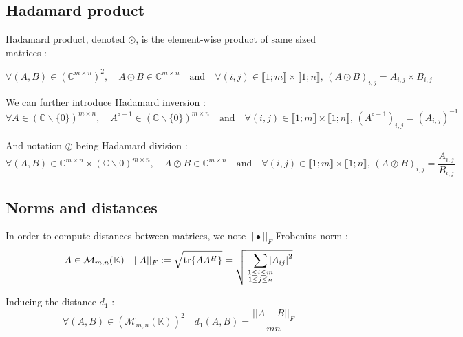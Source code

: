 \documentclass[titlepage]{article}
\newcommand{\hinv}[1]{#1^{\circ-1}} %
\newcommand{\fnorm}[1]{|\vert#1|\vert_{F}} %
\begin{document}
	
		\subsection{Hadamard product}
	
	Hadamard product, denoted $\odot$, is the element-wise product of same sized matrices :
	
	$$
	\forall (A,B)\in\left(\mathbb{C}^{m\times n}\right)^2, \quad A\odot B\in\mathbb{C}^{m\times n} \quad\text{and}\quad \forall (i,j)\in\llbracket1;m\rrbracket\times\llbracket1;n\rrbracket,\, (A\odot B)_{i,j} = A_{i,j}\times B_{i,j}
	$$
	
	We can further introduce Hadamard inversion :
	$$
	\forall A \in \left(\mathbb{C}\backslash\{0\}\right)^{m\times n},\quad \hinv{A}\in\left(\mathbb{C}\backslash\{0\}\right)^{m\times n} \quad\text{and}\quad \forall (i,j)\in\llbracket1;m\rrbracket\times\llbracket1;n\rrbracket,\, \left(\hinv{A}\right)_{i,j} = \left(A_{i,j}\right)^{-1}
	$$ 
	
	And notation $\oslash$ being Hadamard division :
	$$
	\forall (A,B)\in\mathbb{C}^{m\times n}\times\left(\mathbb{C}\backslash0\right)^{m\times n}, \quad A\oslash B\in\mathbb{C}^{m\times n} \quad\text{and}\quad \forall (i,j)\in\llbracket1;m\rrbracket\times\llbracket1;n\rrbracket,\, (A\oslash B)_{i,j} = \frac{A_{i,j}}{B_{i,j}}
	$$
	
	\subsection{Norms and distances}
	
	In order to compute distances between matrices, we note $\fnorm{\bullet}$ Frobenius norm :
	$$
	A\in\mathcal{M}_{m,n}(\mathbb{K}) \quad \fnorm{A} := \sqrt{\tr{AA^H}} = \sqrt{
		\;\;\;\sum_{
			\mathclap{
				\substack{
					1\le i\le m \\1\le j\le n
				}
			}
		}\abs{A_{ij}}^2}
	$$
	
	Inducing the distance $d_1$ :
	$$
	\forall(A,B)\in\left(\mathcal{M}_{m,n}(\mathbb{K})\right)^2\quad d_1(A,B) = \frac{\fnorm{A-B}}{mn}
	$$
	
\end{document}
